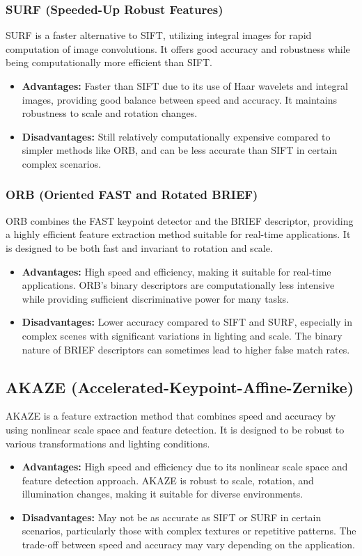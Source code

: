 \subsubsection{SURF (Speeded-Up Robust Features)}
SURF is a faster alternative to SIFT, utilizing integral images for rapid computation of image convolutions. It offers good accuracy and robustness while being computationally more efficient than SIFT.
\begin{itemize}
    \item \textbf{Advantages:} Faster than SIFT due to its use of Haar wavelets and integral images, providing good balance between speed and accuracy. It maintains robustness to scale and rotation changes.
    \item \textbf{Disadvantages:} Still relatively computationally expensive compared to simpler methods like ORB, and can be less accurate than SIFT in certain complex scenarios.
\end{itemize}



\subsubsection{ORB (Oriented FAST and Rotated BRIEF)}
ORB combines the FAST keypoint detector and the BRIEF descriptor, providing a highly efficient feature extraction method suitable for real-time applications. It is designed to be both fast and invariant to rotation and scale.
\begin{itemize}
    \item \textbf{Advantages:} High speed and efficiency, making it suitable for real-time applications. ORB's binary descriptors are computationally less intensive while providing sufficient discriminative power for many tasks.
    \item \textbf{Disadvantages:} Lower accuracy compared to SIFT and SURF, especially in complex scenes with significant variations in lighting and scale. The binary nature of BRIEF descriptors can sometimes lead to higher false match rates.
\end{itemize}

\subsection{AKAZE (Accelerated-Keypoint-Affine-Zernike)}
AKAZE is a feature extraction method that combines speed and accuracy by using nonlinear scale space and feature detection. It is designed to be robust to various transformations and lighting conditions.
\begin{itemize}
    \item \textbf{Advantages:} High speed and efficiency due to its nonlinear scale space and feature detection approach. AKAZE is robust to scale, rotation, and illumination changes, making it suitable for diverse environments.
    \item \textbf{Disadvantages:} May not be as accurate as SIFT or SURF in certain scenarios, particularly those with complex textures or repetitive patterns. The trade-off between speed and accuracy may vary depending on the application.
\end{itemize}

